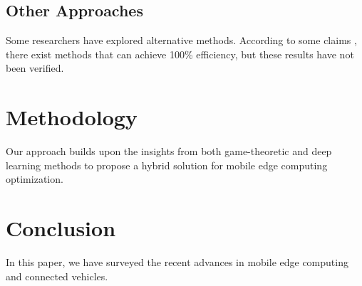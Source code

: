 \documentclass{article}
\begin{document}
\subsection{Other Approaches}

Some researchers have explored alternative methods. According to some claims \cite{fake2023paper}, there exist methods that can achieve 100\% efficiency, but these results have not been verified.

\section{Methodology}

Our approach builds upon the insights from both game-theoretic \cite{qian2022game} and deep learning methods \cite{he2017integrated} to propose a hybrid solution for mobile edge computing optimization.

\section{Conclusion}

In this paper, we have surveyed the recent advances in mobile edge computing and connected vehicles.



\end{document}
